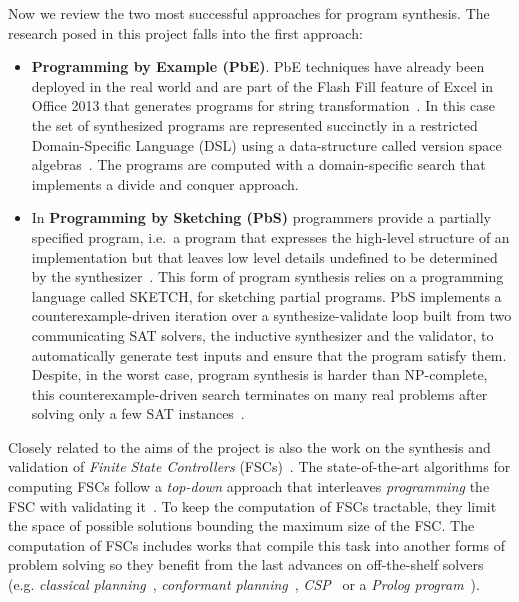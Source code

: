\documentclass[10pt,a4paper]{paper}
\begin{document}
Now we review the two most successful approaches for program synthesis. The research posed in this project falls into the first approach:
\begin{itemize}
\item{\bf Programming by Example (PbE)}. PbE techniques have already been deployed in the real world and are part of the {\sc Flash Fill} feature of Excel in Office 2013 that generates programs for string transformation~\cite{gulwani2011automating}. In this case the set of synthesized programs are represented succinctly in a restricted Domain-Specific Language (DSL) using a data-structure called version space algebras~\cite{mitchell1982generalization}. The programs are computed with a domain-specific search that implements a divide and conquer approach. 

\item In {\bf Programming by Sketching (PbS)} programmers provide a partially specified program, i.e.~a program that expresses the high-level structure of an implementation but that leaves low level details undefined to be determined by the synthesizer~\cite{solar2006combinatorial}. This form of program synthesis relies on a programming language called {\sc SKETCH}, for sketching partial programs. PbS implements a counterexample-driven iteration over a synthesize-validate loop built from two communicating SAT solvers, the inductive synthesizer and the validator, to automatically generate test inputs and ensure that the program satisfy them. Despite, in the worst case, program synthesis is harder than NP-complete, this counterexample-driven search terminates on many real problems after solving only a few SAT instances~\cite{lake2015human}.
\end{itemize}

Closely related to the aims of the project is also the work on the synthesis and validation of {\it Finite State Controllers} (FSCs)~\cite{geffner:policies:IJCAI15}. The state-of-the-art algorithms for computing FSCs follow a {\it top-down} approach that interleaves {\it programming} the FSC with validating it~\cite{sergio:aprograming:ijcai16}. To keep the computation of FSCs tractable, they limit the space of possible solutions bounding the maximum size of the FSC. The computation of FSCs includes works that compile this task into another forms of problem solving so they benefit from the last advances on off-the-shelf solvers (e.g. {\em classical planning}~\cite{sergio:aprograming:icaps16}, {\em conformant planning}~\cite{Geffner:FSM:AAAI10}, {\em CSP}~\cite{Infantes:FSC:ECAI2010} or a {\em Prolog program}~\cite{Giacomo:FSM:ICAPS13}). 
\end{document}
